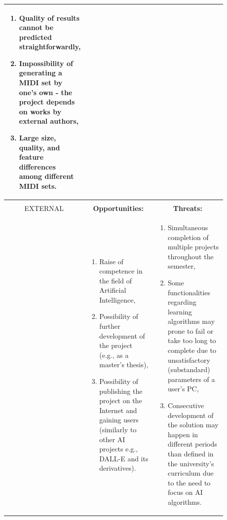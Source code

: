 \documentclass{article}
\begin{document}
\begin{center}
\begin{tabular}{ |p{0.15\linewidth}|p{0.365\linewidth}|p{0.365\linewidth}| }
\begin{enumerate}
            \item Quality of results cannot be predicted straightforwardly,
            \item Impossibility of generating a MIDI set by one's own - the project depends on works by external authors,
            \item Large size, quality, and feature differences among different MIDI sets.
        \end{enumerate}                                                                                 \\
        \hline
                                                                                                                                                         &                                               &                                            \\
        \multicolumn{1}{|c|}{EXTERNAL}                                                                                                                   & \multicolumn{1}{|c|}{\textbf{Opportunities:}} & \multicolumn{1}{|c|}{\textbf{Threats:}}    \\
                                                                                                                                                         &
        \begin{enumerate}
            \item Raise of competence in the field of Artificial Intelligence,
            \item Possibility of further development of the project (e.g., as a master's thesis),
            \item Possibility of publishing the project on the Internet and gaining users (similarly to other AI projects e.g., DALL-E and its derivatives).
        \end{enumerate} &
        \begin{enumerate}
            \item Simultaneous completion of multiple projects throughout the semester,
            \item Some functionalities regarding learning algorithms may prone to fail or take too long to complete due to unsatisfactory (substandard) parameters of a user's PC,
            \item Consecutive development of the solution may happen in different periods than defined in the university's curriculum due to the need to focus on AI algorithms.
        \end{enumerate}                                                                         \\
        \hline
    \end{tabular}
\end{center}

\newpage
\printbibliography
\end{document}
